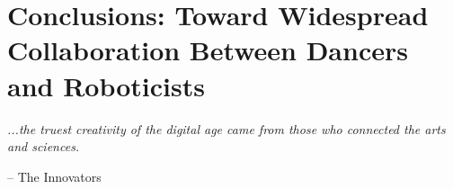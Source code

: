 \documentclass[arts,article,submit,moreauthors,pdftex,10pt,a4paper]{mdpi}
\begin{document}
%
%
%

\section{Conclusions: Toward Widespread Collaboration Between Dancers and Roboticists}
\begin{center}
\textit{...the truest creativity of the digital age came from those who connected the arts and sciences.}
\end{center}
\begin{flushright}
-- The Innovators \cite{isaacson2014innovators}
\end{flushright}
\end{document}
